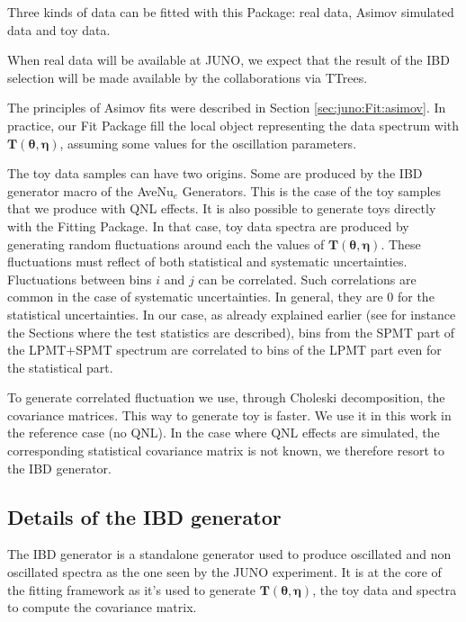 \documentclass[../main.tex]{subfiles}
\begin{document}
Three kinds of data can be fitted with this Package: real data, Asimov simulated data and toy data.

When real data will be available at JUNO, we expect that the result of the IBD selection will be made available by the collaborations via TTrees.

The principles of Asimov fits were described in Section \ref{sec:juno:Fit:asimov}. In practice, our Fit Package fill the local object representing the data spectrum with $\bm{T}(\bm{\theta}, \bm{\eta})$, assuming some values for the oscillation parameters.

The toy data samples can have two origins. Some are produced by the IBD generator macro of the AveNu$_e$ Generators. This is the case of the toy samples that we produce with QNL effects. It is also possible to generate toys directly with the Fitting Package. In that case, toy data spectra are produced by generating random fluctuations around
each the values of $\bm{T}(\bm{\theta}, \bm{\eta})$. These fluctuations must reflect of both statistical and systematic uncertainties. Fluctuations between bins $i$ and $j$ can be correlated. Such correlations are common in the case of systematic uncertainties. In general, they are 0 for the statistical uncertainties. In our case, as already explained earlier (see for instance the Sections where the test statistics are described), bins from the SPMT part of the LPMT+SPMT spectrum are correlated to bins of the LPMT part even for the statistical part.

To generate correlated fluctuation we use, through Choleski decomposition, the covariance matrices. This way to generate toy is faster. We use it in this work in the reference case (no QNL). In the case where QNL effects are simulated, the corresponding statistical covariance matrix is not known, we therefore resort to the IBD generator.


%
%
%
%
\subsection{Details of the IBD generator}
\label{sec:joint_fit:framework:ibd-gen}

The IBD generator is a standalone generator used to produce oscillated and non oscillated spectra as the one seen by the JUNO experiment. It is at the core of the fitting framework as it's used to generate $\bm{T}(\bm{\theta}, \bm{\eta})$, the toy data and spectra to compute the covariance matrix.
\end{document}
